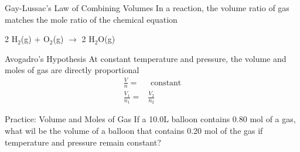 \documentclass[11pt]{beamer}
\begin{document}
\begin{frame}{Gay-Lussac's Law of Combining Volumes}
  In a reaction, the volume ratio of gas matches the mole ratio of
  the chemical equation

  2 H$_2$(g) + O$_2$(g) $\rightarrow$ 2 H$_2$O(g)
\end{frame}

\begin{frame}{Avogadro's Hypothesis}
  At constant temperature and pressure, the volume and moles of gas
  are directly proportional
  \begin{align}
    \frac{V}{n} = & \text{ constant} \\
    \frac{V_1}{n_1} = & \frac{V_2}{n_2}
  \end{align}
\end{frame}

\begin{frame}{Practice: Volume and Moles of Gas}
  If a 10.0L balloon contains 0.80 mol of a gas, what wil be the volume
  of a balloon that contains 0.20 mol of the gas if temperature and
  pressure remain constant?

  \vspace{1.5in}
\end{frame}
\end{document}
